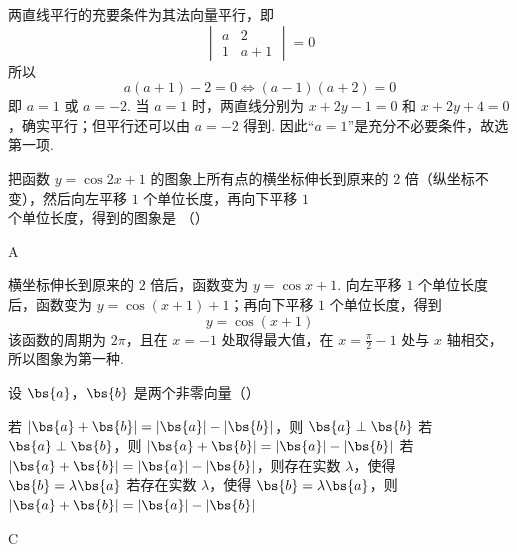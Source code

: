 \begin{solution}
两直线平行的充要条件为其法向量平行，即
\[
\begin{vmatrix}a&2\\1&a+1\end{vmatrix}=0
\]
所以
\[
a(a+1)-2=0\Longleftrightarrow(a-1)(a+2)=0
\]
即 \(a=1\) 或 \(a=-2\).
当 \(a=1\) 时，两直线分别为 \(x+2y-1=0\) 和 \(x+2y+4=0\)，确实平行；但平行还可以由 \(a=-2\) 得到. 因此“\(a=1\)”是充分不必要条件，故选第一项.
\end{solution}

\begin{problem}
把函数 \( y = \cos 2x + 1 \) 的图象上所有点的横坐标伸长到原来的 \(2\) 倍（纵坐标不变），然后向左平移 \(1\) 个单位长度，再向下平移 \(1\) 个单位长度，得到的图象是 （\quad）

    {}
    {}
    {}
\end{problem}

\begin{answer}
A
\end{answer}

\begin{solution}
横坐标伸长到原来的 \(2\) 倍后，函数变为 \(y=\cos x+1\). 向左平移 \(1\) 个单位长度后，函数变为 \(y=\cos(x+1)+1\)；再向下平移 \(1\) 个单位长度，得到
\[
y=\cos(x+1)
\]
该函数的周期为 \(2\pi\)，且在 \(x=-1\) 处取得最大值，在 \(x=\frac{\pi}{2}-1\) 处与 \(x\) 轴相交，所以图象为第一种.
\end{solution}

\begin{problem}
设 \(\bs{a}\)，\(\bs{b}\) 是两个非零向量（\quad）

\choices
    {若 \(|\bs{a} + \bs{b}| = |\bs{a}| - |\bs{b}|\)，则 \(\bs{a} \perp \bs{b}\)}
    {若 \(\bs{a} \perp \bs{b}\)，则 \(|\bs{a} + \bs{b}| = |\bs{a}| - |\bs{b}|\)}
    {若 \(|\bs{a} + \bs{b}| = |\bs{a}| - |\bs{b}|\)，则存在实数 \(\lambda\)，使得 \(\bs{b} = \lambda \bs{a}\)}
    {若存在实数 \(\lambda\)，使得 \(\bs{b} = \lambda \bs{a}\)，则 \(|\bs{a} + \bs{b}| = |\bs{a}| - |\bs{b}|\)}
\end{problem}

\begin{answer}
C
\end{answer}

